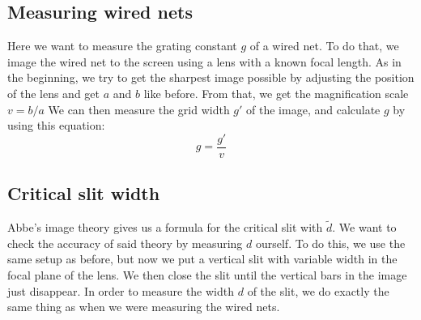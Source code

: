 \subsection{Measuring wired nets}
Here we want to measure the grating constant $g$ of a wired net.
To do that, we image the wired net to the screen using a lens with a known focal length.
As in the beginning, we try to get the sharpest image possible by adjusting the position of the lens and get $a$ and $b$ like before.
From that, we get the magnification scale $v = b/a$
We can then measure the grid width $g'$ of the image, and calculate $g$ by using this equation:
\begin{equation}
	g = \frac{g'}{v}
	\label{eq::grid}
\end{equation}

\subsection{Critical slit width}
Abbe's image theory gives us a formula for the critical slit with $\tilde{d}$.
We want to check the accuracy of said theory by measuring $d$ ourself.
To do this, we use the same setup as before, but now we put a vertical slit with variable width in the focal plane of the lens. 
We then close the slit until the vertical bars in the image just disappear.
In order to measure the width $d$ of the slit, we do exactly the same thing as when we were measuring the wired nets. 
